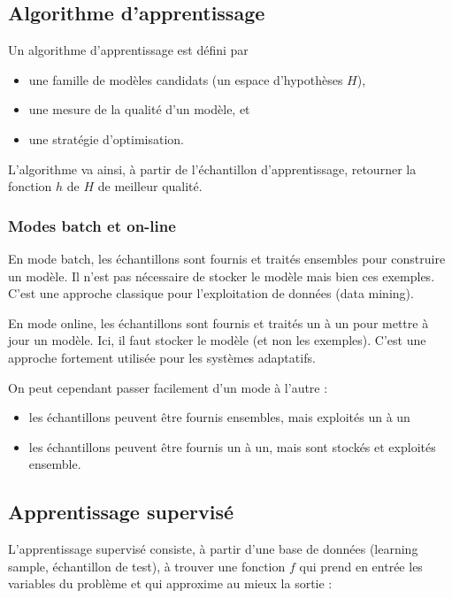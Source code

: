 		\subsection{Algorithme d'apprentissage}
		
		Un algorithme d'apprentissage est défini par

		\begin{itemize}
			\item une famille de modèles candidats (un espace d'hypothèses $H$),
			\item une mesure de la qualité d'un modèle, et
			\item une stratégie d'optimisation.
		\end{itemize}

		L'algorithme va ainsi, à partir de l'échantillon d'apprentissage, retourner la fonction $h$ de $H$ de meilleur qualité.
					
			\subsubsection{Modes batch et on-line}
		
			En mode batch, les échantillons sont fournis et traités ensembles pour construire un modèle. Il n'est pas nécessaire de stocker le modèle mais bien ces exemples. C'est une approche classique pour l'exploitation de données (data mining).
			
		En mode online, les échantillons sont fournis et traités un à un pour mettre à jour un modèle. Ici, il faut stocker le modèle (et non les exemples). C'est une approche fortement utilisée pour les systèmes adaptatifs.
		
			On peut cependant passer facilement d'un mode à l'autre :
		
			\begin{itemize}
				\item les échantillons peuvent être fournis ensembles, mais exploités un à un
				\item les échantillons peuvent être fournis un à un, mais sont stockés et exploités ensemble.
			\end{itemize}
		
		\subsection{Apprentissage supervisé}
		
		L'apprentissage supervisé consiste, à partir d'une base de données (learning sample, échantillon de test), à trouver une fonction $f$ qui prend en entrée les variables du problème et qui approxime au mieux la sortie :

